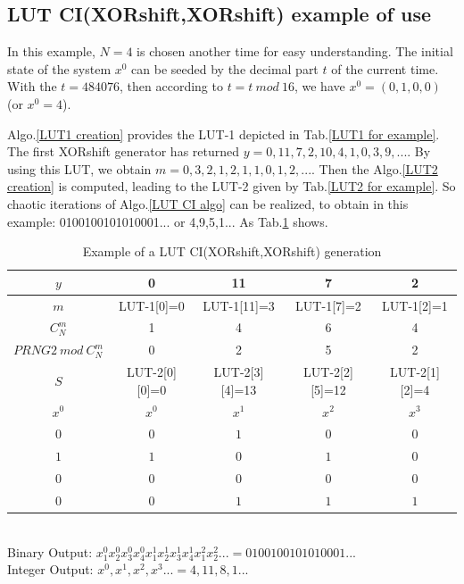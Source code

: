 \subsection{LUT CI(XORshift,XORshift) example of use}
In this example, $N = 4$ is chosen another time for easy understanding.
The initial state of the system $x^0$ can be seeded by the decimal part $t$ of the current time.
With the $t=484076$, then according to $t = t ~mod~ 16$, we have $x^0 = ( 0, 1, 0, 0)$ (or $x^0=4$).

Algo.\ref{LUT1 creation} provides the LUT-1 depicted in Tab.\ref{LUT1 for example}.
The first XORshift generator has returned $y = 0, 11, 7, 2, 10, 4, 1, 0, 3, 9,...$.
By using this LUT, we obtain $m = 0, 3, 2, 1, 2, 1, 1, 0, 1, 2,...$.
Then the Algo.\ref{LUT2 creation} is computed, leading to the LUT-2 given by Tab.\ref{LUT2 for example}.
So chaotic iterations of Algo.\ref{LUT CI algo} can be realized, 
to obtain in this example: 0100100101010001... or 4,9,5,1... As Tab.\ref{lut table application example} shows.

\begin{tiny}
\begin{table} 
\centering
\begin{tabular}{|c|c|c|c|c|}
\hline
$y$ &0 &11 &7&2 \\ \hline
$m$ &LUT-1[0]=0&LUT-1[11]=3&LUT-1[7]=2&LUT-1[2]=1  \\ \hline
$C_N^m$  & 1 & 4&6&4\\ \hline
$PRNG2~ mod~ C_N^m$  & 0 & 2 & 5 & 2\\ \hline
$S$  & LUT-2[0][0]=0& LUT-2[3][4]=13&LUT-2[2][5]=12&LUT-2[1][2]=4  \\ \hline
$x^{0}$ & $x^{0}$ &$x^{1}$ &$x^{2}$& $x^{3}$  \\
$0$ & $0$&$1$ & $0$& $0$\\
$1$ & $1$&$0$ & $1$& $0$\\
$0$ & $0$&$0$ & $0$& $0$ \\
$0$ & $0$&$1$ & $1$& $1$\\
\hline
\end{tabular}\\
\vspace{0.5cm}
Binary Output: $x_1^{0}x_2^{0}x_3^{0}x_4^{0}x_1^{1}x_2^{1}x_3^{1}x_4^{1}x_1^{2}x_2^{2}... = 0100100101010001...$\\
Integer Output:
$x^{0},x^{1},x^{2},x^{3}... = 4,11,8,1...$
\caption{Example of a LUT CI(XORshift,XORshift) generation}
\label{lut table application example}
\end{table}
\end{tiny}


